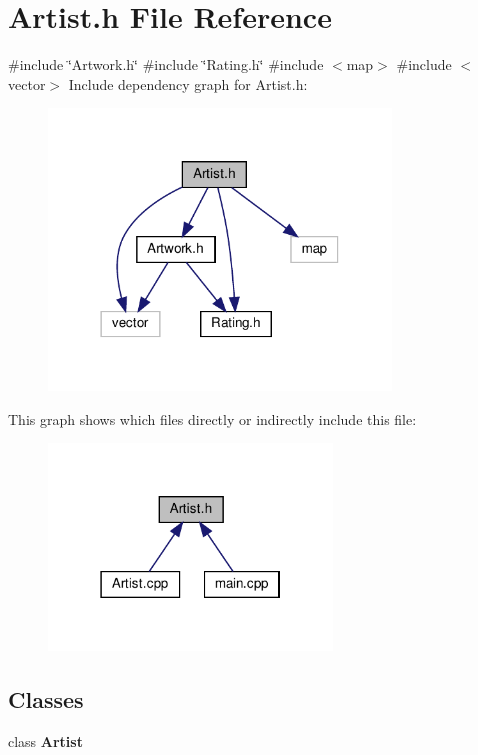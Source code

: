 \section{Artist.\+h File Reference}
\label{_artist_8h}
{\ttfamily \#include \char`\"{}Artwork.\+h\char`\"{}}\newline
{\ttfamily \#include \char`\"{}Rating.\+h\char`\"{}}\newline
{\ttfamily \#include $<$map$>$}\newline
{\ttfamily \#include $<$vector$>$}\newline
Include dependency graph for Artist.\+h\+:\nopagebreak
\begin{figure}[H]
\begin{center}
\leavevmode
\includegraphics[width=258pt]{_artist_8h__incl}
\end{center}
\end{figure}
This graph shows which files directly or indirectly include this file\+:\nopagebreak
\begin{figure}[H]
\begin{center}
\leavevmode
\includegraphics[width=214pt]{_artist_8h__dep__incl}
\end{center}
\end{figure}
\subsection*{Classes}
\begin{DoxyCompactItemize}
\item 
class \textbf{ Artist}
\end{DoxyCompactItemize}
